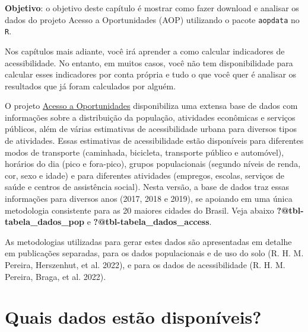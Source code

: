 \documentclass[
  letterpaper,
  DIV=11,
  numbers=noendperiod]{scrreprt}
\begin{document}
\textbf{Objetivo}: o objetivo deste capítulo é mostrar como fazer
download e analisar os dados do projeto Acesso a Oportunidades (AOP)
utilizando o pacote \texttt{aopdata} no \texttt{R}.

Nos capítulos mais adiante, você irá aprender a como calcular
indicadores de acessibilidade. No entanto, em muitos casos, você não tem
disponibilidade para calcular esses indicadores por conta própria e tudo
o que você quer é analisar os resultados que já foram calculados por
alguém.

O projeto \href{https://www.ipea.gov.br/acessooportunidades/}{Acesso a
Oportunidades} disponibiliza uma extensa base de dados com informações
sobre a distribuição da população, atividades econômicas e serviços
públicos, além de várias estimativas de acessibilidade urbana para
diversos tipos de atividades. Essas estimativas de acessibilidade estão
disponíveis para diferentes modos de transporte (caminhada, bicicleta,
transporte público e automóvel), horários do dia (pico e fora-pico),
grupos populacionais (segundo níveis de renda, cor, sexo e idade) e para
diferentes atividades (empregos, escolas, serviços de saúde e centros de
assistência social). Nesta versão, a base de dados traz essas
informações para diversos anos (2017, 2018 e 2019), se apoiando em uma
única metodologia consistente para as 20 maiores cidades do Brasil. Veja
abaixo \textbf{?@tbl-tabela\_dados\_pop} e
\textbf{?@tbl-tabela\_dados\_access}.

\begin{tcolorbox}[enhanced jigsaw, opacityback=0, colback=white, rightrule=.15mm, breakable, toprule=.15mm, left=2mm, leftrule=.75mm, bottomrule=.15mm, arc=.35mm, colframe=quarto-callout-note-color-frame]
\begin{minipage}[t]{5.5mm}
\textcolor{quarto-callout-note-color}{\faInfo}
\end{minipage}%
\begin{minipage}[t]{\textwidth - 5.5mm}
As metodologias utilizadas para gerar estes dados são apresentadas em
detalhe em publicações separadas, para os dados populacionais e de uso
do solo (R. H. M. Pereira, Herszenhut, et al. 2022), e para os dados de
acessibilidade (R. H. M. Pereira, Braga, et al. 2022).\end{minipage}%
\end{tcolorbox}

\part{Quais dados estão disponíveis?}
\end{document}

